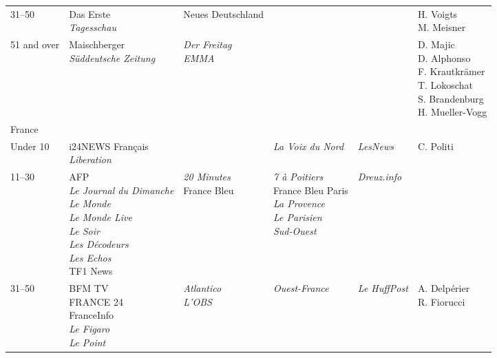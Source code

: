 \begin{table}[ht]
\begin{adjustbox}{width=1\textwidth}
\begin{tabular}{ l  l  l  l  l  l }
			31--50 & \makecell[l]{Das Erste\\\textit{Tagesschau}} & Neues Deutschland & & & \makecell[l]{H. Voigts\\M. Meisner}\\
			
			51 and over & \makecell[l]{Maischberger\\\textit{Süddeutsche Zeitung}} & \makecell[l]{\textit{Der Freitag}\\\textit{EMMA}} & & & \makecell[l]{D. Majic\\D. Alphonso\\F. Krautkrämer\\T. Lokoschat\\S. Brandenburg\\H. Mueller-Vogg}\\
			
			France&&&&&\\
			
			Under 10 & \makecell[l]{i24NEWS Français\\\textit{Liberation}} & & \textit{La Voix du Nord} & \textit{LesNews} & C. Politi\\
			
			11--30 & \makecell[l]{AFP\\\textit{Le Journal du Dimanche}\\\textit{Le Monde}\\\textit{Le Monde Live}\\\textit{Le Soir}\\\textit{Les Décodeurs}\\\textit{Les Echos}\\TF1 News} & \makecell[l]{\textit{20 Minutes}\\France Bleu} & \makecell[l]{\textit{7 à Poitiers}\\France Bleu Paris\\\textit{La Provence}\\\textit{Le Parisien}\\\textit{Sud-Ouest}} & \textit{Dreuz.info} & \\
			
			31–50 & \makecell[l]{BFM TV\\FRANCE 24\\FranceInfo\\\textit{Le Figaro}\\\textit{Le Point}} & \makecell[l]{\textit{Atlantico}\\\textit{L’OBS}} & \textit{Ouest-France} & \textit{Le HuffPost} & \makecell[l]{A. Delpérier\\R. Fiorucci}\\
			

\end{tabular}
\end{adjustbox}
\end{table}

